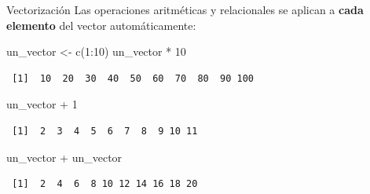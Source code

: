 \documentclass[
  9pt,
  ignorenonframetext,
]{beamer}
\newenvironment{Shaded}{\begin{snugshade}}{\end{snugshade}}
\newcommand{\DecValTok}[1]{\textcolor[rgb]{0.68,0.00,0.00}{#1}}
\newcommand{\FunctionTok}[1]{\textcolor[rgb]{0.28,0.35,0.67}{#1}}
\newcommand{\NormalTok}[1]{\textcolor[rgb]{0.00,0.23,0.31}{#1}}
\newcommand{\OtherTok}[1]{\textcolor[rgb]{0.00,0.23,0.31}{#1}}
\newcommand{\SpecialCharTok}[1]{\textcolor[rgb]{0.37,0.37,0.37}{#1}}
\begin{document}
\begin{frame}[fragile]{Vectorización}
\label{vectorizaciuxf3n}
Las operaciones aritméticas y relacionales se aplican a \textbf{cada
elemento} del vector automáticamente:

\begin{Shaded}
\begin{Highlighting}[]
\NormalTok{un\_vector }\OtherTok{\textless{}{-}} \FunctionTok{c}\NormalTok{(}\DecValTok{1}\SpecialCharTok{:}\DecValTok{10}\NormalTok{)}
\NormalTok{un\_vector }\SpecialCharTok{*} \DecValTok{10}
\end{Highlighting}
\end{Shaded}

\begin{verbatim}
 [1]  10  20  30  40  50  60  70  80  90 100
\end{verbatim}

\begin{Shaded}
\begin{Highlighting}[]
\NormalTok{un\_vector }\SpecialCharTok{+} \DecValTok{1}
\end{Highlighting}
\end{Shaded}

\begin{verbatim}
 [1]  2  3  4  5  6  7  8  9 10 11
\end{verbatim}

\begin{Shaded}
\begin{Highlighting}[]
\NormalTok{un\_vector }\SpecialCharTok{+}\NormalTok{ un\_vector}
\end{Highlighting}
\end{Shaded}

\begin{verbatim}
 [1]  2  4  6  8 10 12 14 16 18 20
\end{verbatim}
\end{frame}
\end{document}
